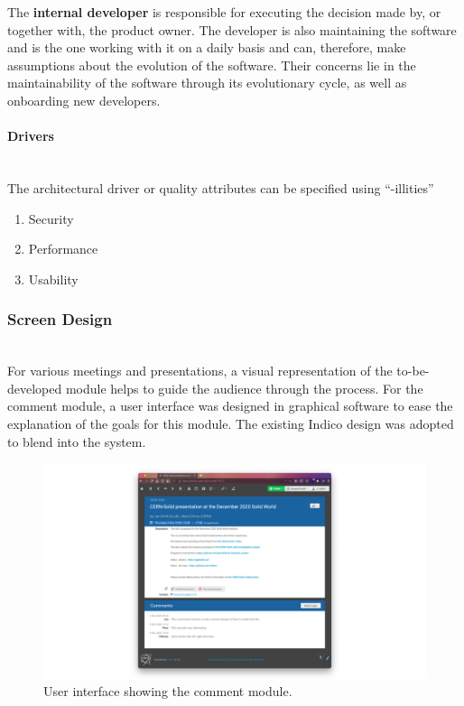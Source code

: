 The \textbf{internal developer} is responsible for executing the decision made by, or together with, the product owner. The developer is also maintaining the software and is the one working with it on a daily basis and can, therefore, make assumptions about the evolution of the software. Their concerns lie in the maintainability of the software through its evolutionary cycle, as well as onboarding new developers.

\paragraph{Drivers}\mbox{}\\

The architectural driver or quality attributes can be specified using “-illities”

\begin{enumerate}
    \item Security
    \item Performance
    \item Usability
\end{enumerate}

\subsubsection{Screen Design}\mbox{}\\

For various meetings and presentations, a visual representation of the to-be-developed module helps to guide the audience through the process. For the comment module, a user interface was designed in graphical software to ease the explanation of the goals for this module. The existing Indico design was adopted to blend into the system.

\begin{figure}
    \centering
    \includegraphics[width=1\textwidth]{prototype/screen_design/indico-comments-screen_design.png}
    \caption{User interface showing the comment module.}
    \label{fig:indico-comments-screen_design}
\end{figure}

